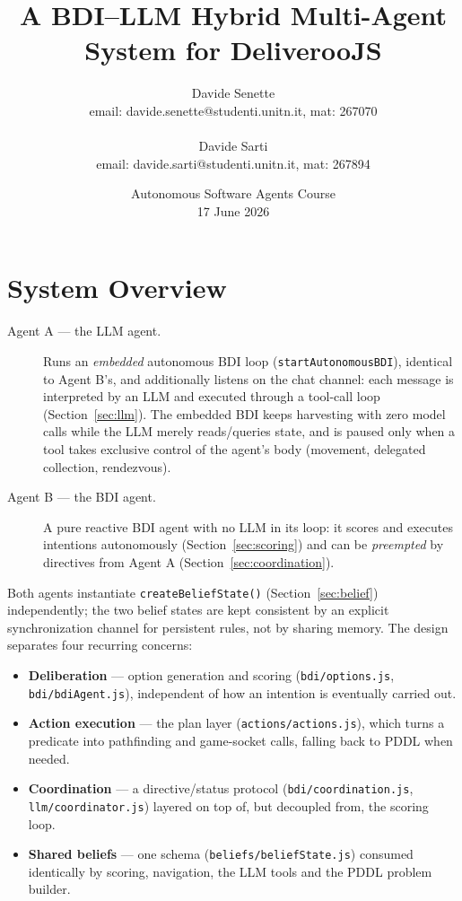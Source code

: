 \documentclass[11pt,a4paper]{article}
\title{\textbf{A BDI--LLM Hybrid Multi-Agent System for DeliverooJS}}
\author{Davide Senette\\email: davide.senette@studenti.unitn.it, mat: 267070 \\\\Davide Sarti\\email: davide.sarti@studenti.unitn.it, mat: 267894}
\date{Autonomous Software Agents Course\\17 June 2026}
\begin{document}
\maketitle

\section{System Overview}
\label{sec:overview}

\begin{description}
  \item[Agent A --- the LLM agent.] Runs an \emph{embedded} autonomous BDI loop
  (\texttt{startAutonomousBDI}), identical to Agent B's, and additionally listens on the chat
  channel: each message is interpreted by an LLM and executed through a tool-call loop
  (Section~\ref{sec:llm}). The embedded BDI keeps harvesting with zero model calls while the LLM
  merely reads/queries state, and is paused only when a tool takes exclusive control of the
  agent's body (movement, delegated collection, rendezvous).
  \item[Agent B --- the BDI agent.] A pure reactive BDI agent with no LLM in its loop: it scores
  and executes intentions autonomously (Section~\ref{sec:scoring}) and can be \emph{preempted} by
  directives from Agent A (Section~\ref{sec:coordination}).
\end{description}

Both agents instantiate \texttt{createBeliefState()} (Section~\ref{sec:belief}) independently;
the two belief states are kept consistent by an explicit synchronization channel for persistent
rules, not by sharing memory. The design separates four recurring concerns:

\begin{itemize}
  \item \textbf{Deliberation} --- option generation and scoring (\texttt{bdi/options.js},
  \texttt{bdi/bdiAgent.js}), independent of how an intention is eventually carried out.
  \item \textbf{Action execution} --- the plan layer (\texttt{actions/actions.js}), which turns
  a predicate into pathfinding and game-socket calls, falling back to PDDL when needed.
  \item \textbf{Coordination} --- a directive/status protocol (\texttt{bdi/coordination.js},
  \texttt{llm/coordinator.js}) layered on top of, but decoupled from, the scoring loop.
  \item \textbf{Shared beliefs} --- one schema (\texttt{beliefs/beliefState.js}) consumed
  identically by scoring, navigation, the LLM tools and the PDDL problem builder.
\end{itemize}
\end{document}
